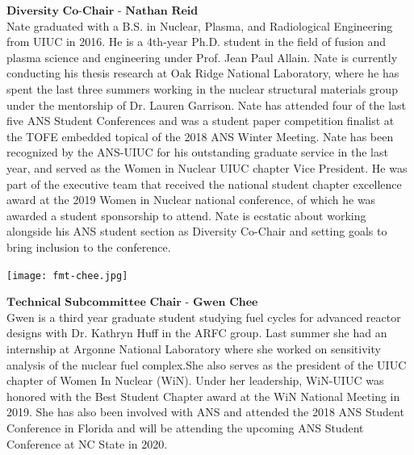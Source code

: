 \begin{minipage}{0.73\textwidth}
$\textbf{Diversity Co-Chair - Nathan Reid}$\\
	Nate graduated with a B.S. in Nuclear, Plasma, and Radiological Engineering from UIUC in 2016. He is a 4th-year Ph.D. student in the field of fusion and plasma science and engineering under Prof. Jean Paul Allain. Nate is currently conducting his thesis research at Oak Ridge National Laboratory, where he has spent the last three summers working in the nuclear structural materials group under the mentorship of Dr. Lauren Garrison. Nate has attended four of the last five ANS Student Conferences and was a student paper competition finalist at the TOFE embedded topical of the 2018 ANS Winter Meeting. Nate has been recognized by the ANS-UIUC for his outstanding graduate service in the last year, and served as the Women in Nuclear UIUC chapter Vice President. He was part of the executive team that received the national student chapter excellence award at the 2019 Women in Nuclear national conference, of which he was awarded a student sponsorship to attend. Nate is ecstatic about working alongside his ANS student section as Diversity Co-Chair and setting goals to bring inclusion to the conference.
\end{minipage}

\begin{minipage}{0.25\textwidth}
	\centering
	\texttt{[image: fmt-chee.jpg]}
\end{minipage}
\begin{minipage}{0.73\textwidth}
$\textbf{Technical Subcommittee Chair - Gwen Chee}$\\
	Gwen is a third year graduate student studying fuel cycles for advanced reactor designs with Dr. Kathryn Huff in the ARFC group. Last summer she had an internship at Argonne National Laboratory where she worked on sensitivity analysis of the nuclear fuel complex.She also serves as the president of the UIUC chapter of Women In Nuclear (WiN). Under her leadership, WiN-UIUC was honored with the Best Student Chapter award at the WiN National Meeting in 2019. She has also been involved with ANS and attended the 2018 ANS Student Conference in Florida and will be attending the upcoming ANS Student Conference at NC State in 2020.
\end{minipage}

